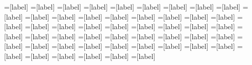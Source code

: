 =[label]	%
=[label]	%
=[label]	%
=[label]	%
=[label]	%
=[label]	%
=[label]	%
=[label]	%
=[label]	%
=[label]	%
=[label]	%
=[label]	%
=[label]	%
=[label]	%
=[label]	%
=[label]	%
=[label]	%
=[label]	%
=[label]	%
=[label]	%
=[label]	%
=[label]	%
=[label]	%
=[label]	%
=[label]	%
=[label]	%
=[label]	%
=[label]	%
=[label]	%
=[label]	%
=[label]	%
=[label]	%
=[label]	%
=[label]	%
=[label]	%
=[label]	%
=[label]	%
=[label]	%
=[label]	%
=[label]	%
=[label]	%
=[label]	%
=[label]	%
=[label]	%
=[label]	%
=[label]	%
=[label]	%
=[label]	%
=[label]	%
=[label]	%
=[label]	%
